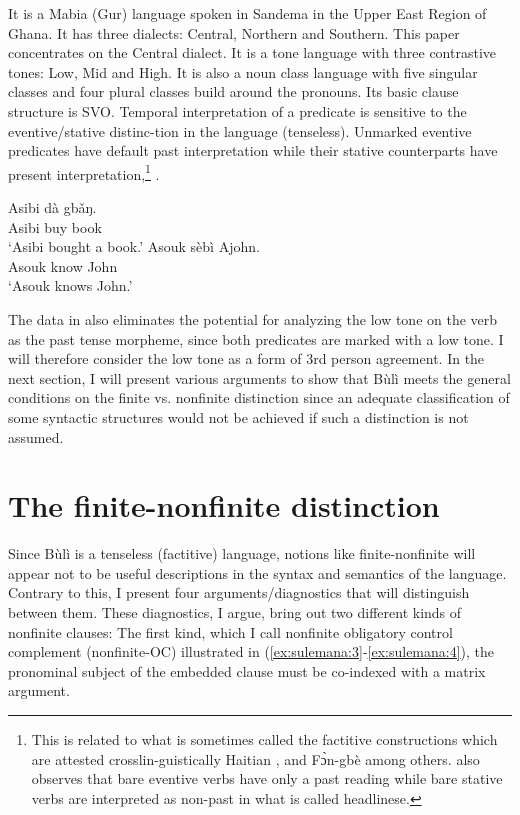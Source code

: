 \documentclass[output=paper,colorlinks,citecolor=brown]{langscibook}
\begin{document}
It is a Mabia (Gur) language spoken in Sandema in the Upper East Region of Ghana. It has three dialects: Central, Northern and Southern. This paper concentrates on the Central dialect. It is a tone language with three contrastive tones: Low, Mid and High. It is also a noun class language with five singular classes and four plural classes build around the pronouns. Its basic clause structure is SVO. Temporal interpretation of a predicate is sensitive to the eventive/stative distinc-tion in the language (tenseless). Unmarked eventive predicates have default past interpretation while their stative counterparts have present interpretation,\footnote{This is related to what is sometimes called the factitive constructions which are attested crosslin-guistically Haitian \citep{Dechaine1991}, and Fɔ̀n-gbè \citep{Avolonto1992} among others. \citet{Stowell1991} also observes that bare eventive verbs have only a past reading while bare stative verbs are interpreted as non-past in what is called headlinese.} . 

\ea%
    \label{ex:sulemana:2}
    \ea%
    \label{ex:sulemana:2a}
    \gll    Asibi  dà gbǎŋ.\\
            Asibi buy book\\
    \glt    `Asibi bought a book.' 
    \ex%
    \label{ex:sulemana:2b}
    \gll    Asouk sèbì Ajohn.\\
            Asouk know John\\
    \glt    `Asouk knows John.'
    \z 
\z

The data in  also eliminates the potential for analyzing the low tone on the verb as the past tense morpheme, since both predicates are marked with a low tone. I will therefore consider the low tone as a form of 3rd person agreement. In the next section, I will present various arguments to show that Bùlì meets the general conditions on the finite vs. nonfinite distinction since an adequate classification of some syntactic structures would not be achieved if such a distinction is not assumed. 

\section{The finite-nonfinite distinction}\label{sec:sulemana:3}

Since Bùlì is a tenseless (factitive) language, notions like finite-nonfinite will appear not to be  useful descriptions in the syntax and semantics of the language. Contrary to this, I present four arguments/diagnostics that will distinguish between them. These diagnostics, I argue, bring out two different kinds of nonfinite clauses: The first kind, which I call nonfinite obligatory control  complement (nonfinite-OC) illustrated in (\ref{ex:sulemana:3}-\ref{ex:sulemana:4}), the pronominal subject of the embedded clause  must be co-indexed with a matrix argument. 
\end{document}
